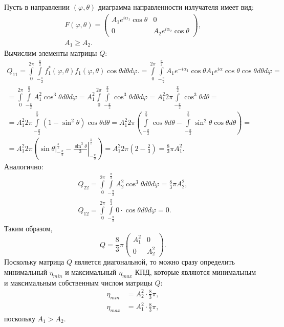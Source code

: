 Пусть в направлении $(\varphi, \theta)$ диаграмма направленности излучателя имеет вид:
\begin{gather*}
    F(\varphi, \theta)
    = \begin{pmatrix}
        A_1 e^{i \alpha_1} \cos \theta & 0                              \\
        0                              & A_2 e^{i \alpha_2} \cos \theta
    \end{pmatrix} , \\
    A_1 \ge A_2.
\end{gather*}
Вычислим элементы матрицы $Q$:
\begin{multline*}
    Q_{11}
    = \int \limits_0^{2 \pi} \int \limits_{-\frac{\pi}{2}}^\frac{\pi}{2} f_1^*(\varphi, \theta) f_1(\varphi, \theta) \cos \theta d\theta d\varphi .
    = \int \limits_0^{2 \pi} \int \limits_{-\frac{\pi}{2}}^\frac{\pi}{2} A_1 e^{-i \alpha_1} \cos \theta A_1 e^{i \alpha} \cos \theta \cos \theta d\theta d\varphi = \\
    = \int \limits_0^{2 \pi} \int \limits_{-\frac{\pi}{2}}^\frac{\pi}{2} A_1^2 \cos^3 \theta d\theta d\varphi
    = A_1^2 \int \limits_0^{2 \pi} \int \limits_{-\frac{\pi}{2}}^\frac{\pi}{2} \cos^3 \theta d\theta d\varphi
    = A_1^2 2 \pi \int \limits_{-\frac{\pi}{2}}^\frac{\pi}{2} \cos^3 \theta d\theta = \\
    = A_1^2 2 \pi \int \limits_{-\frac{\pi}{2}}^\frac{\pi}{2} (1 - \sin^2 \theta ) \cos \theta d\theta
    = A_1^2 2 \pi \left( \int \limits_{-\frac{\pi}{2}}^\frac{\pi}{2} \cos \theta d\theta - \int \limits_{-\frac{\pi}{2}}^\frac{\pi}{2} \sin^2 \theta \cos \theta d\theta \right) = \\
    = A_1^2 2 \pi \left( \left. \sin \theta \right|_{-\frac{\pi}{2}}^\frac{\pi}{2} - \left. \frac{\sin^3 \theta}{3} \right|_{-\frac{\pi}{2}}^\frac{\pi}{2} \right)
    = A_1^2 2 \pi \left( 2 - \frac{2}{3} \right)
    = \frac{8}{3} \pi A_1^2 .
\end{multline*}
Аналогично:
\begin{gather*}
    Q_{22}
    = \int \limits_0^{2 \pi} \int \limits_{-\frac{\pi}{2}}^\frac{\pi}{2} A_2^2 \cos^3 \theta d\theta d\varphi
    = \frac{8}{3} \pi A_2^2 , \\
    Q_{12}
    = \int \limits_0^{2 \pi} \int \limits_{-\frac{\pi}{2}}^\frac{\pi}{2} 0 \cdot \cos \theta d\theta d\varphi
    = 0 .
\end{gather*}
Таким образом,
\[
    Q
    = \frac{8}{3} \pi
    \begin{pmatrix}
        A_1^2 & 0     \\
        0     & A_2^2
    \end{pmatrix} .
\]
Поскольку матрица $Q$ является диагональной, то можно сразу определить минимальный $\eta_{min}$ и максимальный $\eta_{max}$ КПД, которые являются минимальным и максимальным собственным
числом матрицы $Q$:
\begin{align*}
    \eta_{min} & = A_2^2 \cdot \frac{8}{3} \pi , \\
    \eta_{max} & = A_1^2 \cdot \frac{8}{3} \pi ,
\end{align*}
поскольку $A_1 > A_2$.

